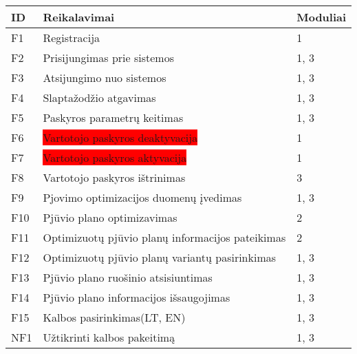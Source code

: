 \documentclass[a4paper,12pt]{article}
\begin{document}
\begin{frame}
\centering
\hspace{-2.5cm}
\label{my-label}
\begin{tabular}{|l|l|l|}
\hline
\textbf{ID}	& \textbf{Reikalavimai}						& \textbf{Moduliai}  \\ \hline

F1	& Registracija										& 1	    	\\ \hline

F2	& Prisijungimas prie sistemos						& 1, 3	\\ \hline

F3	& Atsijungimo nuo sistemos							& 1, 3	\\ \hline

F4	& Slaptažodžio atgavimas								& 1, 3	\\ \hline

F5	& Paskyros parametrų keitimas 	  					& 1, 3	\\ \hline 

F6	& \colorbox{red}{Vartotojo paskyros deaktyvacija}	& 1		\\ \hline

F7	& \colorbox{red}{Vartotojo paskyros aktyvacija}		& 1		\\ \hline

F8	& Vartotojo paskyros ištrinimas						& 3		\\ \hline

F9	& Pjovimo optimizacijos duomenų įvedimas				& 1, 3	\\ \hline

F10	& Pjūvio plano optimizavimas           	   			& 2		\\ \hline

F11	& Optimizuotų pjūvio planų informacijos pateikimas	& 2     	\\ \hline

F12	& Optimizuotų pjūvio planų variantų pasirinkimas		& 1, 3	\\ \hline

F13 & Pjūvio plano ruošinio atsisiuntimas				& 1, 3	\\ \hline

F14 	& Pjūvio plano informacijos išsaugojimas				& 1, 3	\\ \hline

F15	& Kalbos pasirinkimas(LT, EN)						& 1, 3	\\ \hline

NF1 & Užtikrinti kalbos pakeitimą						& 1, 3	\\ \hline


\end{tabular}
\end{frame}
\end{document}
